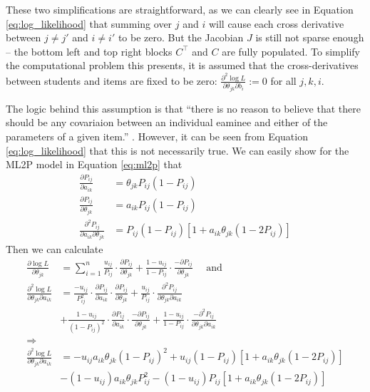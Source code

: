 These two simplifications are straightforward, as we can clearly see in Equation \ref{eq:log_likelihood} that summing over $j$ and $i$ will cause each cross derivative between $j \not = j'$ and $i \not = i'$ to be zero. But the Jacobian $J$ is still not sparse enough -- the bottom left and top right blocks $C^\top$ and $C$ are fully populated. To simplify the computational problem this presents, it is assumed that the cross-derivatives between students and items are fixed to be zero: $\frac{\partial^2 \log L}{\partial\theta_{jk} \partial b_{i}} := 0$ for all $j,k,i$. 

The logic behind this assumption is that ``there is no reason to believe that there should be any covariaion between an individual eaminee and either of the parameters of a given item.'' \cite{baker_kim2004}. However, it can be seen from Equation \ref{eq:log_likelihood} that this is not necessarily true. We can easily show for the ML2P model in Equation \ref{eq:ml2p} that 
\begin{equation}
\begin{split}
  \frac{\partial P_{ij}}{\partial a_{ik}} &= \theta_{jk}P_{ij}(1-P_{ij}) \\
  \frac{\partial P_{ij}}{\partial \theta_{jk}} &= a_{ik}P_{ij}(1-P_{ij}) \\
  \frac{\partial^2 P_{ij}}{\partial a_{ik}\partial \theta_{jk}} &= P_{ij}(1-P_{ij})\left[ 1 + a_{ik} \theta_{jk} (1-2P_{ij}) \right]
\end{split}
\label{eq:ml2p_deriv}
\end{equation}
Then we can calculate
\begin{equation}
\begin{split}
  \frac{\partial \log L}{\partial \theta_{jk}} &= \sum_{i=1}^n  \frac{u_{ij}}{P_{ij}} \cdot \frac{\partial P_{ij}}{\partial \theta_{jk}} + \frac{1-u_{ij}}{1-P_{ij}} \cdot \frac{-\partial P_{ij}}{\partial \theta_{jk}} \quad \text{ and} \\
  \frac{\partial^2 \log L}{\partial \theta_{jk} \partial a_{ik}} &= \frac{-u_{ij}}{P_{ij}^2} \cdot \frac{\partial P_{ij}}{\partial a_{ik}} \cdot \frac{\partial P_{ij}}{\partial \theta_{jk}} + \frac{u_{ij}}{P_{ij}} \cdot \frac{\partial^2 P_{ij}}{\partial \theta_{jk}\partial a_{ik}} \\
  &+ \frac{1-u_{ij}}{(1-P_{ij})^2} \cdot \frac{\partial P_{ij}}{\partial a_{ik}} \cdot \frac{-\partial P_{ij}}{\partial \theta_{jk}} + \frac{1-u_{ij}}{1-P_{ij}} \cdot \frac{-\partial^2 P_{ij}}{\partial \theta_{jk} \partial a_{ik}} \\
  \Longrightarrow& \\
  \frac{\partial^2 \log L}{\partial \theta_{jk} \partial a_{ik}} &= -u_{ij}a_{ik}\theta_{jk}(1-P_{ij})^2 + u_{ij}(1-P_{ij})\left[1 + a_{ik}\theta_{jk}(1-2P_{ij})\right] \\
  &- (1-u_{ij})a_{ik}\theta_{jk}P_{ij}^2 - (1-u_{ij})P_{ij}\left[1 + a_{ik}\theta_{jk}(1-2P_{ij})\right]
\end{split}
  \label{eq:partial_deriv_nonzero}
\end{equation}
